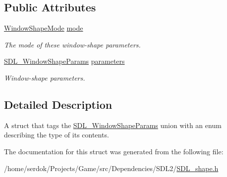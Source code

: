 \subsection*{Public Attributes}
\begin{DoxyCompactItemize}
\item 
\mbox{\label{structSDL__WindowShapeMode_a40ebd8b9a76d982cbd87563386cc05de}} 
\hyperlink{SDL__shape_8h_aa30948f2699e316a43b740eccebe5c20}{Window\+Shape\+Mode} \hyperlink{structSDL__WindowShapeMode_a40ebd8b9a76d982cbd87563386cc05de}{mode}
\begin{DoxyCompactList}\small\item\em The mode of these window-\/shape parameters. \end{DoxyCompactList}\item 
\mbox{\label{structSDL__WindowShapeMode_a2f79bb294034156207fa6d88d3a8c819}} 
\hyperlink{unionSDL__WindowShapeParams}{S\+D\+L\+\_\+\+Window\+Shape\+Params} \hyperlink{structSDL__WindowShapeMode_a2f79bb294034156207fa6d88d3a8c819}{parameters}
\begin{DoxyCompactList}\small\item\em Window-\/shape parameters. \end{DoxyCompactList}\end{DoxyCompactItemize}


\subsection{Detailed Description}
A struct that tags the \hyperlink{unionSDL__WindowShapeParams}{S\+D\+L\+\_\+\+Window\+Shape\+Params} union with an enum describing the type of its contents. 

The documentation for this struct was generated from the following file\+:\begin{DoxyCompactItemize}
\item 
/home/serdok/\+Projects/\+Game/src/\+Dependencies/\+S\+D\+L2/\hyperlink{SDL__shape_8h}{S\+D\+L\+\_\+shape.\+h}\end{DoxyCompactItemize}
